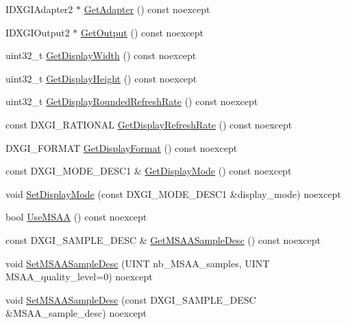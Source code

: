 \begin{DoxyCompactItemize}
\item 
I\+D\+X\+G\+I\+Adapter2 $\ast$ \hyperlink{structmage_1_1_display_configuration_a415acc2cba9d5f28dc42073bb69fbac2}{Get\+Adapter} () const noexcept
\item 
I\+D\+X\+G\+I\+Output2 $\ast$ \hyperlink{structmage_1_1_display_configuration_aa328570fbfc6456c0e5d90e738aec81b}{Get\+Output} () const noexcept
\item 
uint32\+\_\+t \hyperlink{structmage_1_1_display_configuration_abb8e00caf3bf4fbe3948657d760b760f}{Get\+Display\+Width} () const noexcept
\item 
uint32\+\_\+t \hyperlink{structmage_1_1_display_configuration_ad8deade0aec6e88e41fee0ba688cbec9}{Get\+Display\+Height} () const noexcept
\item 
uint32\+\_\+t \hyperlink{structmage_1_1_display_configuration_a70ad309284f4741f7ce9aafc38577715}{Get\+Display\+Rounded\+Refresh\+Rate} () const noexcept
\item 
const D\+X\+G\+I\+\_\+\+R\+A\+T\+I\+O\+N\+AL \hyperlink{structmage_1_1_display_configuration_aa92237613f8077d189f9504fec371cb8}{Get\+Display\+Refresh\+Rate} () const noexcept
\item 
D\+X\+G\+I\+\_\+\+F\+O\+R\+M\+AT \hyperlink{structmage_1_1_display_configuration_a412215b18edac3ec6bf18cd00d8c689b}{Get\+Display\+Format} () const noexcept
\item 
const D\+X\+G\+I\+\_\+\+M\+O\+D\+E\+\_\+\+D\+E\+S\+C1 \& \hyperlink{structmage_1_1_display_configuration_a20270be6a17deab929fce25596edabd4}{Get\+Display\+Mode} () const noexcept
\item 
void \hyperlink{structmage_1_1_display_configuration_a23401fc0c20d52d44480c32fc6020e85}{Set\+Display\+Mode} (const D\+X\+G\+I\+\_\+\+M\+O\+D\+E\+\_\+\+D\+E\+S\+C1 \&display\+\_\+mode) noexcept
\item 
bool \hyperlink{structmage_1_1_display_configuration_a7bf7445c7242fc8d943b04d1975cfa72}{Use\+M\+S\+AA} () const noexcept
\item 
const D\+X\+G\+I\+\_\+\+S\+A\+M\+P\+L\+E\+\_\+\+D\+E\+SC \& \hyperlink{structmage_1_1_display_configuration_a254a0752dd6d1ec68121cd6495a10a02}{Get\+M\+S\+A\+A\+Sample\+Desc} () const noexcept
\item 
void \hyperlink{structmage_1_1_display_configuration_a8ebca1a6dba8750c31316e5c40f5b056}{Set\+M\+S\+A\+A\+Sample\+Desc} (U\+I\+NT nb\+\_\+\+M\+S\+A\+A\+\_\+samples, U\+I\+NT M\+S\+A\+A\+\_\+quality\+\_\+level=0) noexcept
\item 
void \hyperlink{structmage_1_1_display_configuration_abf2e5e21fe3fdde7a95fd518a882a8d1}{Set\+M\+S\+A\+A\+Sample\+Desc} (const D\+X\+G\+I\+\_\+\+S\+A\+M\+P\+L\+E\+\_\+\+D\+E\+SC \&M\+S\+A\+A\+\_\+sample\+\_\+desc) noexcept

\end{DoxyCompactItemize}
